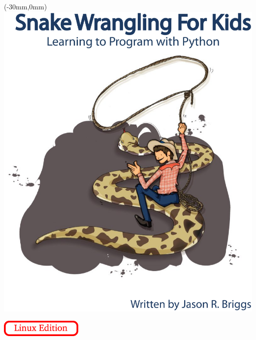 \pagestyle{empty}
\frontmatter
\begin{titlepage}
\begin{textblock*}{210mm}(-30mm,0mm)
   \includegraphics[width=0.9\paperwidth]{../en/cover.eps}
\end{textblock*}
\begin{flushright}
\vspace{30mm}
\includegraphics[width=40mm]{../en/linux-edition.eps} 
\end{flushright}
\end{titlepage}

